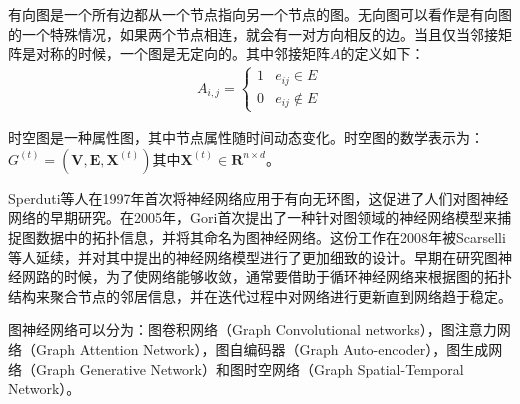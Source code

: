 \begin{definition}[有向图]
\label{def:directed-graph}
有向图是一个所有边都从一个节点指向另一个节点的图。无向图可以看作是有向图的一个特殊情况，如果两个节点相连，就会有一对方向相反的边。当且仅当邻接矩阵是对称的时候，一个图是无定向的。其中邻接矩阵$A$的定义如下：
\begin{align}
    A_{i,j} = \begin{cases}
      1 & e_{ij} \in E \\
      0 & e_{ij} \notin E
    \end{cases}
  \end{align}
\end{definition}

\begin{definition}[时空图]
\label{def:spatial-temporal-graph}
时空图是一种属性图，其中节点属性随时间动态变化。时空图的数学表示为：$G^{(t)}=\left(\mathbf{V}, \mathbf{E}, \mathbf{X}^{(t)}\right) \text{其中} \mathbf{X}^{(t)} \in \mathbf{R}^{n \times d}$。
\end{definition}

Sperduti\cite{sperduti1997supervised}等人在1997年首次将神经网络应用于有向无环图，这促进了人们对图神经网络的早期研究。在2005年，Gori\cite{gori2005new}首次提出了一种针对图领域的神经网络模型来捕捉图数据中的拓扑信息，并将其命名为图神经网络。这份工作在2008年被Scarselli\cite{scarselli2008graph}等人延续，并对其中提出的神经网络模型进行了更加细致的设计。早期在研究图神经网路的时候，为了使网络能够收敛，通常要借助于循环神经网络来根据图的拓扑结构来聚合节点的邻居信息，并在迭代过程中对网络进行更新直到网络趋于稳定。

图神经网络可以分为：图卷积网络（Graph Convolutional networks），图注意力网络（Graph Attention Network），图自编码器（Graph Auto-encoder），图生成网络（Graph Generative Network）和图时空网络（Graph Spatial-Temporal Network）。

